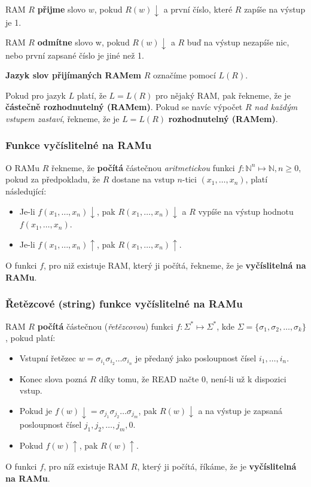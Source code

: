 \documentclass[11pt]{report} %
\newcommand{\N}{\mathbb{N}}
\begin{document}
RAM $R$ \textbf{přijme} slovo $w$, pokud $R(w){\downarrow}$ a první číslo, které $R$ zapíše na výstup je 1.

RAM $R$ \textbf{odmítne} slovo w, pokud $R(w){\downarrow}$ a $R$ buď na výstup nezapíše nic, nebo první zapsané číslo je jiné než 1.

\textbf{Jazyk slov přijímaných RAMem} $R$ označíme pomocí $L(R)$. 

Pokud pro jazyk $L$ platí, že $L = L(R)$ pro nějaký RAM, pak řekneme, že je \textbf{částečně rozhodnutelný (RAMem)}. Pokud se navíc výpočet $R$ \textit{nad každým vstupem zastaví}, řekneme, že je $L = L(R)$ \textbf{rozhodnutelný (RAMem)}.

\subsubsection{Funkce vyčíslitelné na RAMu}
O RAMu $R$ řekneme, že \textbf{počítá} částečnou \textit{aritmetickou} funkci $f : \N^n \mapsto \N, n \geq 0$, pokud za předpokladu, že $R$ dostane na vstup $n$-tici $(x_1, \dots, x_n)$, platí následující:
\begin{itemize}
	\leftskip 20pt
	\setlength{\itemsep}{0pt}
	\item Je-li $f(x_1, \dots, x_n){\downarrow}$, pak $R(x_1, \dots, x_n){\downarrow}$ a $R$ vypíše na výstup hodnotu $f(x_1, \dots, x_n)$.
	\item Je-li $f(x_1, \dots, x_n){\uparrow}$, pak $R(x_1, \dots, x_n){\uparrow}$.
\end{itemize}
O funkci $f$, pro niž existuje RAM, který ji počítá, řekneme, že je \textbf{vyčíslitelná na RAMu}.

\subsubsection{Řetězcové (string) funkce vyčíslitelné na RAMu}
RAM $R$ \textbf{počítá} částečnou (\textit{řetězcovou}) funkci $f : \Sigma^* \mapsto \Sigma^*$, kde $\Sigma = \{\sigma_1, \sigma_2, \dots, \sigma_k\}$, pokud platí:
\begin{itemize}
	\leftskip 20pt
	\setlength{\itemsep}{0pt}
	\item Vstupní řetězec $w = \sigma_{i_1}\sigma_{i_2}\dots\sigma_{i_n}$ je předaný jako posloupnost čísel $i_1, \dots, i_n$.
	\item Konec slova pozná $R$ díky tomu, že READ načte 0, není-li už k dispozici vstup.
	\item Pokud je $f(w){\downarrow}= \sigma_{j_1}\sigma_{j_2}\dots\sigma_{j_m}$, pak $R(w){\downarrow}$ a na výstup je
	zapsaná posloupnost čísel $j_1, j_2, \dots, j_m, 0$.
	\item Pokud $f(w){\uparrow}$, pak $R(w){\uparrow}$.
\end{itemize}
O funkci $f$, pro níž existuje RAM $R$, který ji počítá, říkáme, že je \textbf{vyčíslitelná na RAMu}.
\end{document}
